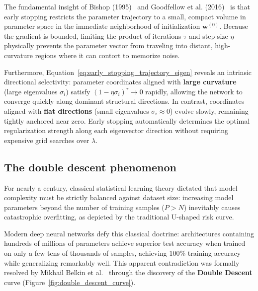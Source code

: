 \begin{intuition}
The fundamental insight of Bishop (1995)~\cite{bishop1995training} and Goodfellow et al. (2016)~\cite{goodfellow2016deep} is that early stopping restricts the parameter trajectory to a small, compact volume in parameter space in the immediate neighborhood of initialization $\mathbf{w}^{(0)}$. Because the gradient is bounded, limiting the product of iterations $\tau$ and step size $\eta$ physically prevents the parameter vector from traveling into distant, high-curvature regions where it can contort to memorize noise.

Furthermore, Equation~\eqref{eq:early_stopping_trajectory_eigen} reveals an intrinsic directional selectivity: parameter coordinates aligned with \textbf{large curvature} (large eigenvalues $\sigma_i$) satisfy $(1 - \eta \sigma_i)^\tau \to 0$ rapidly, allowing the network to converge quickly along dominant structural directions. In contrast, coordinates aligned with \textbf{flat directions} (small eigenvalues $\sigma_i \approx 0$) evolve slowly, remaining tightly anchored near zero. Early stopping automatically determines the optimal regularization strength along each eigenvector direction without requiring expensive grid searches over $\lambda$.
\end{intuition}

\subsection{The double descent phenomenon}
\label{sec:double_descent_phenomenon}

For nearly a century, classical statistical learning theory dictated that model complexity must be strictly balanced against dataset size: increasing model parameters beyond the number of training samples ($P > N$) inevitably causes catastrophic overfitting, as depicted by the traditional U-shaped risk curve.

Modern deep neural networks defy this classical doctrine: architectures containing hundreds of millions of parameters achieve superior test accuracy when trained on only a few tens of thousands of samples, achieving 100\% training accuracy while generalizing remarkably well. This apparent contradiction was formally resolved by Mikhail Belkin et al.~\cite{belkin2019reconciling} through the discovery of the \textbf{Double Descent} curve (Figure~\ref{fig:double_descent_curve}).

